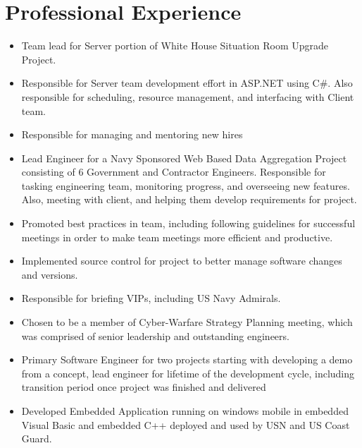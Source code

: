 \documentclass[a4paper, oneside, final, 10pt]{scrartcl}
\begin{document}
\section{Professional Experience}



\begin{itemize}
  \item Team lead for Server portion of White House Situation Room Upgrade Project.
  \item Responsible for Server team development effort in ASP.NET using C\#. Also responsible for scheduling, resource management, and interfacing with Client team. 
  \item Responsible for managing and mentoring new hires 
\end{itemize}

\begin{itemize}
  \item Lead Engineer for a Navy Sponsored Web Based Data Aggregation Project consisting of 6 Government and Contractor Engineers.  Responsible for tasking engineering team, monitoring progress, and overseeing new features. Also, meeting with client, and helping them develop requirements for project.  
  \item Promoted best practices in team, including following guidelines for successful meetings in order to make team meetings more efficient and productive. 
  \item Implemented source control for project to better manage software changes and versions.
  \item Responsible for briefing VIPs, including US Navy Admirals.
  \item Chosen to be a member of Cyber-Warfare Strategy Planning meeting, which was comprised of senior leadership and outstanding engineers.
\end{itemize}

\begin{itemize}
  \item Primary Software Engineer for two projects starting with developing a demo from a concept, lead engineer for lifetime of the development cycle, including transition period once project was finished and delivered
  \item Developed Embedded Application running on windows mobile in embedded Visual Basic and embedded C++ deployed and used by USN and US Coast Guard.
\end{itemize}
\end{document}
